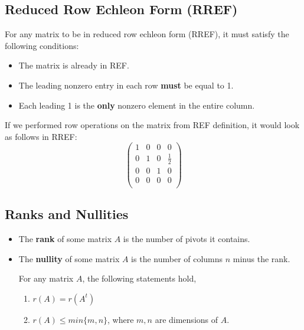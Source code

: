 \documentclass[a4paper]{article}
\begin{document}
  \subsection{Reduced Row Echleon Form (RREF)}
  For any matrix to be in reduced row echleon form (RREF), it must satisfy the following conditions:
  \begin{itemize}
    \item The matrix is already in REF.
    \item The leading nonzero entry in each row \textbf{must} be equal to 1.
    \item Each leading 1 is the \textbf{only} nonzero element in the entire column.
  \end{itemize}
  If we performed row operations on the matrix from REF definition, it would look as follows in RREF:
  \[
    \begin{pmatrix}
      1 & 0 & 0 & 0 \\  
      0 & 1 & 0 & \frac{1 }{2} \\  
      0 & 0 & 1 & 0 \\  
      0 & 0 & 0 & 0 \\  
    \end{pmatrix}
  \]
  \subsection{Ranks and Nullities}
  \begin{itemize}
    \item The \textbf{rank} of some matrix $A$ is the number of pivots it contains.
    \item The \textbf{nullity} of some matrix $A$ is the number of columns $n$ minus the rank.
  \begin{theorem}
    For any matrix $A$, the following statements hold,
    \begin{enumerate}
      \item $r(A) = r(A^t)$
      \item $r(A) \le min\{m,n\}$, where $m,n$ are dimensions of $A$.
    \end{enumerate}
  \end{theorem}
  
  \end{itemize}
  \newpage
\end{document}
